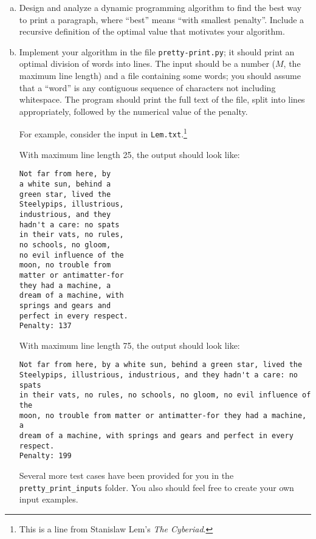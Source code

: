 \documentclass[11pt]{article}
\begin{document}
\begin{enumerate}[(a)]
\item
Design and analyze a dynamic programming algorithm to find the best way to print a paragraph, where ``best'' means ``with smallest penalty''.
Include a recursive definition of the optimal value that motivates your algorithm.



\hspace{-10mm}



\item
Implement your algorithm in the file {\tt pretty-print.py};
it should print an optimal division of words into lines.
The input should be a number ($M$, the maximum line length) and a file containing some words;
you should assume that a ``word'' is any contiguous sequence of characters not including whitespace.
The program should print the full text of the file, split into lines appropriately, followed by the numerical value of the penalty.

For example, consider the input in {\tt Lem.txt}.\footnote{This is a line from Stanislaw Lem's \emph{The Cyberiad}.}

With maximum line length 25, the output should look like:

\begin{verbatim}
Not far from here, by
a white sun, behind a   
green star, lived the   
Steelypips, illustrious,
industrious, and they   
hadn't a care: no spats 
in their vats, no rules,
no schools, no gloom,   
no evil influence of the
moon, no trouble from   
matter or antimatter-for
they had a machine, a   
dream of a machine, with
springs and gears and   
perfect in every respect.
Penalty: 137
\end{verbatim}

With maximum line length 75, the output should look like:

\begin{verbatim}
Not far from here, by a white sun, behind a green star, lived the       
Steelypips, illustrious, industrious, and they hadn't a care: no spats  
in their vats, no rules, no schools, no gloom, no evil influence of the 
moon, no trouble from matter or antimatter-for they had a machine, a    
dream of a machine, with springs and gears and perfect in every respect.
Penalty: 199
\end{verbatim}

Several more test cases have been provided for you in the \texttt{pretty\_print\_inputs} folder.
You also should feel free to create your own input examples.

\end{enumerate}
\end{document}
